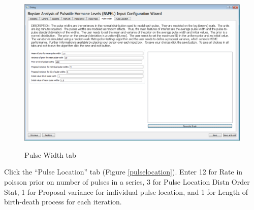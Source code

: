 \documentclass[11pt]{book}
\begin{document}
\begin{figure}
  \centering
  \includegraphics[width=\textwidth]{pulsewidthtab.PNG}\\
  \caption{Pulse Width tab}\label{pulsewidth}
\end{figure}
\newpage
Click the ``Pulse Location'' tab (Figure \ref{pulselocation}). Enter 12 for Rate in poisson prior on number of pulses in a series, 3 for Pulse Location Distn Order Stat, 1 for Proposal variance for individual pulse location, and 1 for Length of birth-death process for each iteration.
\end{document}

